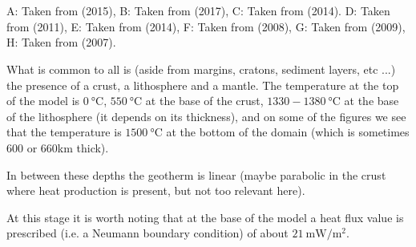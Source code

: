 \begin{center}
\\
\\
{\captionfont 
A: Taken from \textcite{albe15} (2015),
B: Taken from \textcite{bube17} (2017),
C: Taken from \textcite{bubj14} (2014).
D: Taken from \textcite{hube11} (2011),
E: Taken from \textcite{hube14} (2014),
F: Taken from \textcite{wabj08} (2008),
G: Taken from \textcite{bejb09} (2009),
H: Taken from \textcite{cubh07} (2007).}
\end{center}

What is common to all is (aside from margins, cratons, sediment layers, etc ...) the presence 
of a crust, a lithosphere and a mantle. 
The temperature at the top of the model is $0~\si{\celsius}$, $550~\si{\celsius}$ at the base of the 
crust, $1330-1380~\si{\celsius}$ at the base of the lithosphere (it depends on its thickness), 
and on some of the figures we see that the temperature is $1500~\si{\celsius}$ at the bottom of the 
domain (which is sometimes 600 or 660km thick).

In between these depths the geotherm is linear (maybe parabolic in the crust where heat production
is present, but not too relevant here).

At this stage it is worth noting that at the base of the model a heat flux value is prescribed
(i.e. a Neumann boundary condition) of about $21~\si{\milli\watt\per\square\meter}$.

